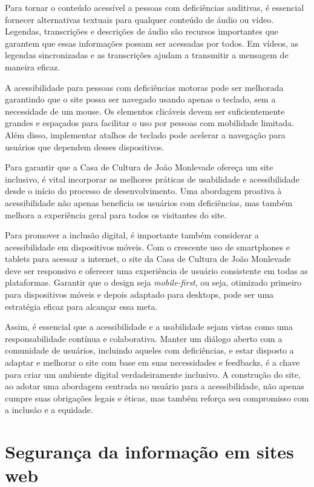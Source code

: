 Para tornar o conteúdo acessível a pessoas com deficiências auditivas, é essencial fornecer alternativas textuais para qualquer conteúdo de áudio ou vídeo. Legendas, transcrições e descrições de áudio são recursos importantes que garantem que essas informações possam ser acessadas por todos. Em vídeos, as legendas sincronizadas e as transcrições ajudam a transmitir a mensagem de maneira eficaz.

A acessibilidade para pessoas com deficiências motoras pode ser melhorada garantindo que o site possa ser navegado usando apenas o teclado, sem a necessidade de um mouse. Os elementos clicáveis devem ser suficientemente grandes e espaçados para facilitar o uso por pessoas com mobilidade limitada. Além disso, implementar atalhos de teclado pode acelerar a navegação para usuários que dependem desses dispositivos.

Para garantir que a Casa de Cultura de João Monlevade ofereça um site inclusivo, é vital incorporar as melhores práticas de usabilidade e acessibilidade desde o início do processo de desenvolvimento. Uma abordagem proativa à acessibilidade não apenas beneficia os usuários com deficiências, mas também melhora a experiência geral para todos os visitantes do site.

Para promover a inclusão digital, é importante também considerar a acessibilidade em dispositivos móveis. Com o crescente uso de smartphones e tablets para acessar a internet, o site da Casa de Cultura de João Monlevade deve ser responsivo e oferecer uma experiência de usuário consistente em todas as plataformas. Garantir que o design seja \textit{mobile-first}, ou seja, otimizado primeiro para dispositivos móveis e depois adaptado para desktops, pode ser uma estratégia eficaz para alcançar essa meta.

Assim, é essencial que a acessibilidade e a usabilidade sejam vistas como uma responsabilidade contínua e colaborativa. Manter um diálogo aberto com a comunidade de usuários, incluindo aqueles com deficiências, e estar disposto a adaptar e melhorar o site com base em suas necessidades e feedbacks, é a chave para criar um ambiente digital verdadeiramente inclusivo. A construção do site, ao adotar uma abordagem centrada no usuário para a acessibilidade, não apenas cumpre suas obrigações legais e éticas, mas também reforça seu compromisso com a inclusão e a equidade.


\section{Segurança da informação em sites web}

